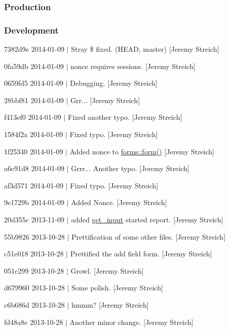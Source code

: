 \subsubsection*{Production}

\subsubsection*{Development}


\begin{DoxyItemize}
\item 7382d9e 2014-\/01-\/09 $|$ Stray \$ fixed. (H\-E\-A\-D, master) \mbox{[}Jeremy Streich\mbox{]}
\item 0fa59db 2014-\/01-\/09 $|$ nonce requires sessions. \mbox{[}Jeremy Streich\mbox{]}
\item 0659fd5 2014-\/01-\/09 $|$ Debugging. \mbox{[}Jeremy Streich\mbox{]}
\item 28bbf81 2014-\/01-\/09 $|$ Grr... \mbox{[}Jeremy Streich\mbox{]}
\item f413ef0 2014-\/01-\/09 $|$ Fixed another typo. \mbox{[}Jeremy Streich\mbox{]}
\item 1584f2a 2014-\/01-\/09 $|$ Fixed typo. \mbox{[}Jeremy Streich\mbox{]}
\item 1f25340 2014-\/01-\/09 $|$ Added nonce to \hyperlink{classforms_aca4fdeecf56bc5796f628a477f9ce629}{forms\-::form()} \mbox{[}Jeremy Streich\mbox{]}
\item a6c91d8 2014-\/01-\/09 $|$ Grrr... Another typo. \mbox{[}Jeremy Streich\mbox{]}
\item af3d571 2014-\/01-\/09 $|$ Fixed typo. \mbox{[}Jeremy Streich\mbox{]}
\item 9e1729b 2014-\/01-\/09 $|$ Added Nonce. \mbox{[}Jeremy Streich\mbox{]}
\item 20d355c 2013-\/11-\/09 $|$ added \hyperlink{classget__input}{get\-\_\-input} started report. \mbox{[}Jeremy Streich\mbox{]}
\item 55b9826 2013-\/10-\/28 $|$ Prettification of some other files. \mbox{[}Jeremy Streich\mbox{]}
\item c51e018 2013-\/10-\/28 $|$ Prettified the add field form. \mbox{[}Jeremy Streich\mbox{]}
\item 051c299 2013-\/10-\/28 $|$ Growl. \mbox{[}Jeremy Streich\mbox{]}
\item d679960 2013-\/10-\/28 $|$ Some polish. \mbox{[}Jeremy Streich\mbox{]}
\item c6b686d 2013-\/10-\/28 $|$ hmmm? \mbox{[}Jeremy Streich\mbox{]}
\item fd48a8e 2013-\/10-\/28 $|$ Another minor change. \mbox{[}Jeremy Streich\mbox{]}

\end{DoxyItemize}
